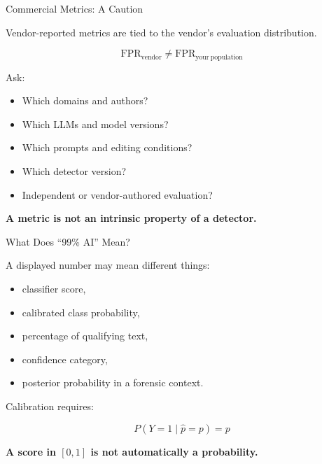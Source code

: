 \documentclass[11pt,compress,t,notes=noshow, xcolor=table]{beamer}
\begin{document}
\begin{vbframe}{Commercial Metrics: A Caution}

Vendor-reported metrics are tied to the vendor's evaluation distribution.

\[
\mathrm{FPR}_{\mathrm{vendor}}
\neq
\mathrm{FPR}_{\mathrm{your\ population}}
\]

Ask:

\begin{itemize}
    \item Which domains and authors?
    \item Which LLMs and model versions?
    \item Which prompts and editing conditions?
    \item Which detector version?
    \item Independent or vendor-authored evaluation?
\end{itemize}

\begin{center}
\textbf{A metric is not an intrinsic property of a detector.}
\end{center}

\end{vbframe}

\begin{vbframe}{What Does ``99\% AI'' Mean?}

A displayed number may mean different things:

\begin{itemize}
    \item classifier score,
    \item calibrated class probability,
    \item percentage of qualifying text,
    \item confidence category,
    \item posterior probability in a forensic context.
\end{itemize}

Calibration requires:

\[
P(Y=1\mid \hat p=p)=p
\]

\begin{center}
\textbf{A score in \([0,1]\) is not automatically a probability.}
\end{center}

\end{vbframe}
\end{document}
